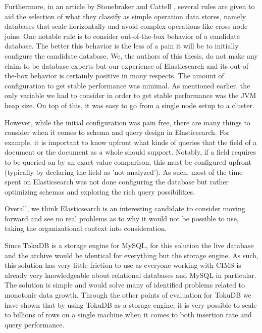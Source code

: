 Furthermore, in an article by Stonebraker and Cattell \cite{10rules}, several rules are given to aid the selection of what they classify as simple operation data stores, namely databases that scale horizontally and avoid complex operations like cross node joins. One notable rule is to consider out-of-the-box behavior of a candidate database. The better this behavior is the less of a pain it will be to initially configure the candidate database. We, the authors of this thesis, do not make any claim to be database experts but our experience of Elasticsearch and its out-of-the-box behavior is certainly positive in many respects. The amount of configuration to get stable performance was minimal. As mentioned earlier, the only variable we had to consider in order to get stable performance was the JVM heap size. On top of this, it was easy to go from a single node setup to a cluster. 

However, while the initial configuration was pain free, there are many things to consider when it comes to schema and query design in Elasticsearch. For example, it is important to know upfront what kinds of queries that the field of a document or the document as a whole should support. Notably, if a field requires to be queried on by an exact value comparison, this must be configured upfront (typically by declaring the field as 'not analyzed'). As such, most of the time spent on Elasticsearch was not done configuring the database but rather optimizing schemas and exploring the rich query possibilities.

Overall, we think Elasticsearch is an interesting candidate to consider moving forward and see no real problems as to why it would not be possible to use, taking the organizational context into consideration.

Since TokuDB is a storage engine for MySQL, for this solution the live database and the archive would be identical for everything but the storage engine. As such, this solution has very little friction to use as everyone working with CIMS is already very knowledgeable about relational databases and MySQL in particular. The solution is simple and would solve many of identified problems related to monotonic data growth. Through the other points of evaluation for TokuDB we have shown that by using TokuDB as a storage engine, it is very possible to scale to billions of rows on a single machine when it comes to both insertion rate and query performance.